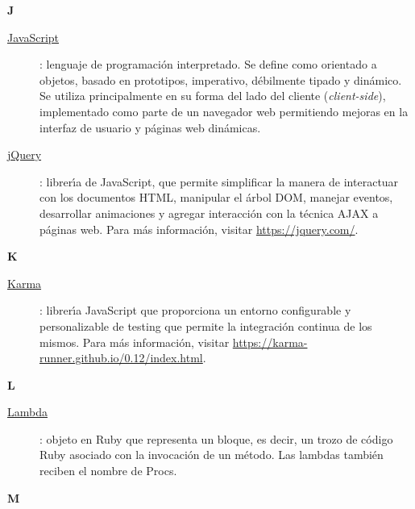 \bigskip
\newpage

{\bfseries {\Huge J}}\label{Apendice1:J}
\bigskip
\bigskip

\begin{description}
  \item[\underline{JavaScript}\label{apend1:js}]: lenguaje de programaci\'on interpretado. Se define como orientado a objetos, basado en prototipos, imperativo, d\'ebilmente tipado y 
  din\'amico. Se utiliza principalmente en su forma del lado del cliente (\textit{client-side}), implementado como parte de un navegador web permitiendo mejoras en la interfaz de usuario y p\'aginas 
web din\'amicas.
  \bigskip

  \item[\underline{jQuery}\label{apend1:jquery}]: librer\'{\i}a de JavaScript, que permite simplificar la manera de interactuar con los documentos HTML, manipular el \'arbol DOM, manejar 
  eventos, desarrollar animaciones y agregar interacci\'on con la t\'ecnica AJAX a p\'aginas web. Para m\'as informaci\'on, visitar {\small \url{https://jquery.com/}}.
  \bigskip
\end{description}

\bigskip
{\bfseries {\Huge K}}\label{Apendice1:K}
\bigskip
\bigskip

\begin{description}
  \item[\underline{Karma}\label{apend1:karma}]: librer\'{\i}a JavaScript que proporciona un entorno configurable y personalizable de testing que permite la 
  integraci\'on continua de los mismos. Para m\'as informaci\'on, visitar {\small \url{https://karma-runner.github.io/0.12/index.html}}.
  \bigskip
\end{description}

\bigskip
{\bfseries {\Huge L}}\label{Apendice1:L}
\bigskip
\bigskip

\begin{description}
  \item[\underline{Lambda}\label{apend1:lambda}]: objeto en Ruby que representa un bloque, es decir, un trozo de c\'odigo Ruby asociado con la invocaci\'on de un m\'etodo. Las lambdas tambi\'en 
  reciben el nombre de Procs.
  \bigskip
\end{description}

\bigskip
{\bfseries {\Huge M}}\label{Apendice1:M}
\bigskip
\bigskip

